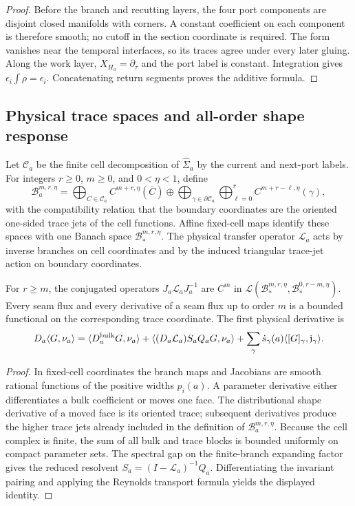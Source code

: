 \begin{proof}
Before the branch and recutting layers, the four port components are disjoint
closed manifolds with corners.  A constant coefficient on each component is
therefore smooth; no cutoff in the section coordinate is required.  The form
vanishes near the temporal interfaces, so its traces agree under every later
gluing.  Along the work layer, \(X_{H_a}=\partial_\tau\) and the port label is
constant.  Integration gives \(\epsilon_i\int\rho=\epsilon_i\).  Concatenating
return segments proves the additive formula.
\end{proof}

\subsection{Physical trace spaces and all-order shape response}

Let \(\mathcal C_a\) be the finite cell decomposition of
\(\widehat\Sigma_a\) by the current and next-port labels.  For integers
\(r\ge0\), \(m\ge0\), and \(0<\eta<1\), define
\[
\mathscr B_a^{m,r,\eta}=
\bigoplus_{C\in\mathcal C_a}C^{m+r,\eta}(\overline C)
\oplus
\bigoplus_{\gamma\in\partial\mathcal C_a}
\bigoplus_{\ell=0}^{r}C^{m+r-\ell,\eta}(\gamma),
\]
with the compatibility relation that the boundary coordinates are the
oriented one-sided trace jets of the cell functions.  Affine fixed-cell maps
identify these spaces with one Banach space \(\mathscr B_*^{m,r,\eta}\).
The physical transfer operator \(\mathcal L_a\) acts by inverse branches on
cell coordinates and by the induced triangular trace-jet action on boundary
coordinates.

\begin{lemma}
\label{lem:r6-a1-shape}
For \(r\ge m\), the conjugated operators
\(J_a\mathcal L_aJ_a^{-1}\) are \(C^m\) in
\(\mathcal L(\mathscr B_*^{m,r,\eta},\mathscr B_*^{0,r-m,\eta})\).
Every seam flux and every derivative of a seam flux up to order \(m\) is a
bounded functional on the corresponding trace coordinate.  The first
physical derivative is
\[
D_a\langle G,\nu_a\rangle
=\langle D_a^{\rm bulk}G,\nu_a\rangle
+\langle (D_a\mathcal L_a)S_aQ_aG,\nu_a\rangle
+\sum_\gamma \dot s_\gamma(a)
\langle [G]_{\gamma},\mathfrak j_{\gamma}\rangle.
\]
\end{lemma}

\begin{proof}
In fixed-cell coordinates the branch maps and Jacobians are smooth rational
functions of the positive widths \(p_i(a)\).  A parameter derivative either
differentiates a bulk coefficient or moves one face.  The distributional
shape derivative of a moved face is its oriented trace; subsequent derivatives
produce the higher trace jets already included in the definition of
\(\mathscr B_a^{m,r,\eta}\).  Because the cell complex is finite, the sum of
all bulk and trace blocks is bounded uniformly on compact parameter sets.
The spectral gap on the finite-branch expanding factor gives the reduced
resolvent \(S_a=(I-\mathcal L_a)^{-1}Q_a\).  Differentiating the invariant
pairing and applying the Reynolds transport formula yields the displayed
identity.
\end{proof}

